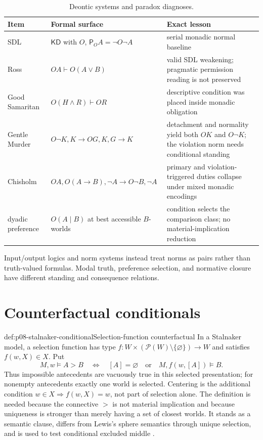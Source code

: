 \begin{table}[htbp]
\centering\small
\begin{tabularx}{\textwidth}{@{}l X X@{}}
\toprule
Item & Formal surface & Exact lesson \\
\midrule
SDL & \(\mathsf{KD}\) with \(O\),
\(\mathsf P_OA=\neg O\neg A\) & serial monadic normal baseline \\
Ross & \(OA\vdash O(A\lor B)\) & valid SDL weakening; pragmatic permission
reading is not preserved \\
Good Samaritan & \(O(H\land R)\vdash OR\) & descriptive condition was placed
inside monadic obligation \\
Gentle Murder & \(O\neg K,K\to OG,K,G\to K\) & detachment and normality yield
both \(OK\) and \(O\neg K\); the violation norm needs conditional standing \\
Chisholm & \(OA,O(A\to B),\neg A\to O\neg B,\neg A\) & primary and
violation-triggered duties collapse under mixed monadic encodings \\
dyadic preference & \(O(A\mid B)\) at best accessible \(B\)-worlds & condition
selects the comparison class; no material-implication reduction \\
\bottomrule
\end{tabularx}
\caption{Deontic systems and paradox diagnoses.}
\label{tab:p08-deontic-systems}
\end{table}

Input/output logics and norm systems instead treat norms as pairs rather than
truth-valued formulas.  Modal truth, preference selection, and normative
closure have different standing and consequence relations.

\section{Counterfactual conditionals}

\begin{hbdefinition}{def:p08-stalnaker-conditional}{Selection-function counterfactual}
In a Stalnaker model, a selection function has type
\(f:W\times(\mathcal P(W)\setminus\{\varnothing\})\to W\) and satisfies
\(f(w,X)\in X\).  Put
\[
 M,w\models A>B
 \quad\Longleftrightarrow\quad
 [A]=\varnothing
 \quad\text{or}\quad
 M,f(w,[A])\models B.
\]
Thus impossible antecedents are vacuously true in this selected presentation;
for nonempty antecedents exactly one world is selected.  Centering is the
additional condition \(w\in X\Rightarrow f(w,X)=w\), not part of selection
alone.  The definition is needed because the
connective \(>\) is not material implication and because uniqueness is stronger
than merely having a set of closest worlds. It stands as a semantic clause,
differs from Lewis's sphere semantics through unique selection, and is used to
test conditional excluded middle \cite{Stalnaker1968}.
\end{hbdefinition}

